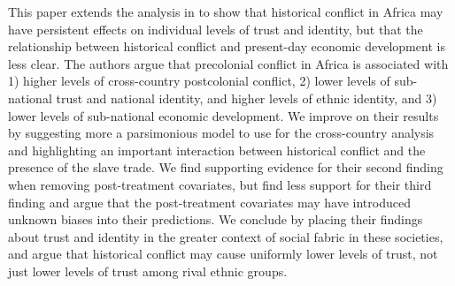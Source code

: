 This paper extends the analysis in \cite{BesleyRQ2014} to show that historical conflict in Africa may have persistent effects on individual levels of trust and identity, but that the relationship between historical conflict and present-day economic development is less clear. The authors argue that precolonial conflict in Africa is associated with 1) higher levels of cross-country postcolonial conflict, 2) lower levels of sub-national trust and national identity, and higher levels of ethnic identity, and 3) lower levels of sub-national economic development. We improve on their results by suggesting more a parsimonious model to use for the cross-country analysis and highlighting an important interaction between historical conflict and the presence of the slave trade. We find supporting evidence for their second finding when removing post-treatment covariates, but find less support for their third finding and argue that the post-treatment covariates may have introduced unknown biases into their predictions. We conclude by placing their findings about trust and identity in the greater context of social fabric in these societies, and argue that historical conflict may cause uniformly lower levels of trust, not just lower levels of trust among rival ethnic groups. 